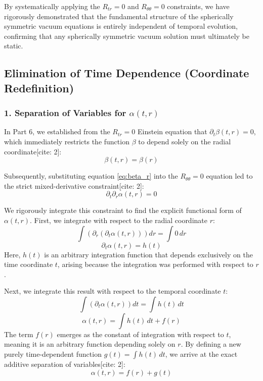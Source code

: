 \documentclass[11pt, a4paper]{report}
\begin{document}
By systematically applying the $R_{tr} = 0$ and $R_{\theta\theta} = 0$ constraints, we have rigorously demonstrated that the fundamental structure of the spherically symmetric vacuum equations is entirely independent of temporal evolution, confirming that any spherically symmetric vacuum solution must ultimately be static.



\subsection*{Elimination of Time Dependence (Coordinate Redefinition)}

\subsubsection*{1. Separation of Variables for $\alpha(t,r)$}

In Part 6, we established from the $R_{tr} = 0$ Einstein equation that $\partial_t \beta(t,r) = 0$, which immediately restricts the function $\beta$ to depend solely on the radial coordinate[cite: 2]:
\begin{equation}
    \beta(t,r) = \beta(r) \label{eq:beta_r}
\end{equation}

Subsequently, substituting equation \eqref{eq:beta_r} into the $R_{\theta\theta} = 0$ equation led to the strict mixed-derivative constraint[cite: 2]:
\begin{equation}
    \partial_t \partial_r \alpha(t,r) = 0
\end{equation}

We rigorously integrate this constraint to find the explicit functional form of $\alpha(t,r)$. First, we integrate with respect to the radial coordinate $r$:
\begin{equation}
    \int \left( \partial_r \left( \partial_t \alpha(t,r) \right) \right) dr = \int 0 \, dr
\end{equation}
\begin{equation}
    \partial_t \alpha(t,r) = h(t)
\end{equation}
Here, $h(t)$ is an arbitrary integration function that depends exclusively on the time coordinate $t$, arising because the integration was performed with respect to $r$. 

Next, we integrate this result with respect to the temporal coordinate $t$:
\begin{equation}
    \int \left( \partial_t \alpha(t,r) \right) dt = \int h(t) \, dt
\end{equation}
\begin{equation}
    \alpha(t,r) = \int h(t) \, dt + f(r)
\end{equation}
The term $f(r)$ emerges as the constant of integration with respect to $t$, meaning it is an arbitrary function depending solely on $r$. By defining a new purely time-dependent function $g(t) = \int h(t) \, dt$, we arrive at the exact additive separation of variables[cite: 2]:
\begin{equation}
    \alpha(t,r) = f(r) + g(t) \label{eq:alpha_separated}
\end{equation}
\end{document}

